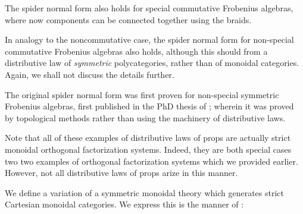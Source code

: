 \begin{remark}
The spider normal form also holds for special commutative Frobenius algebras, where now components can be connected together using the braids.


In analogy to the noncommutative case, the spider normal form  for non-special commutative Frobenius algebras also holds, although this should from a distributive law of {\em symmetric} polycategories, rather than of monoidal categories.  Again, we shall not discuss the details further.


The original spider normal form was first proven for non-special symmetric Frobenius algebras, first published in the PhD thesis of \cite{spider}; wherein it was proved by topological methods rather than using the machinery of distributive laws.

\end{remark}

%
%

Note that all of these examples of distributive laws of props are actually strict monoidal orthogonal factorization systems.  Indeed, they are both special cases two two examples of orthogonal factorization systems which we provided earlier.   However, not all distributive laws of props arize in this manner.

We define a variation of a symmetric monoidal theory which generates strict Cartesian monoidal categories.  We express this is the manner of \cite{????}:


